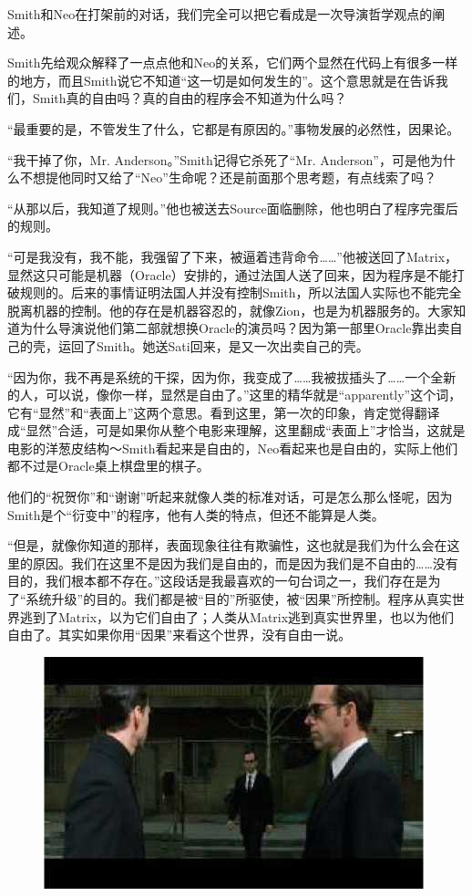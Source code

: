 \documentclass{ctexart}
\begin{document}
Smith和Neo在打架前的对话，我们完全可以把它看成是一次导演哲学观点的阐述。

Smith先给观众解释了一点点他和Neo的关系，它们两个显然在代码上有很多一样的地方，而且Smith说它不知道“这一切是如何发生的”。这个意思就是在告诉我们，Smith真的自由吗？真的自由的程序会不知道为什么吗？

“最重要的是，不管发生了什么，它都是有原因的。”事物发展的必然性，因果论。

“我干掉了你，Mr. Anderson。”Smith记得它杀死了“Mr. Anderson”，可是他为什么不想提他同时又给了“Neo”生命呢？还是前面那个思考题，有点线索了吗？

“从那以后，我知道了规则。”他也被送去Source面临删除，他也明白了程序完蛋后的规则。

“可是我没有，我不能，我强留了下来，被逼着违背命令……”他被送回了Matrix，显然这只可能是机器（Oracle）安排的，通过法国人送了回来，因为程序是不能打破规则的。后来的事情证明法国人并没有控制Smith，所以法国人实际也不能完全脱离机器的控制。他的存在是机器容忍的，就像Zion，也是为机器服务的。大家知道为什么导演说他们第二部就想换Oracle的演员吗？因为第一部里Oracle靠出卖自己的壳，运回了Smith。她送Sati回来，是又一次出卖自己的壳。

“因为你，我不再是系统的干探，因为你，我变成了……我被拔插头了……一个全新的人，可以说，像你一样，显然是自由了。”这里的精华就是“apparently”这个词，它有“显然”和“表面上”这两个意思。看到这里，第一次的印象，肯定觉得翻译成“显然”合适，可是如果你从整个电影来理解，这里翻成“表面上”才恰当，这就是电影的洋葱皮结构～Smith看起来是自由的，Neo看起来也是自由的，实际上他们都不过是Oracle桌上棋盘里的棋子。

他们的“祝贺你”和“谢谢”听起来就像人类的标准对话，可是怎么那么怪呢，因为Smith是个“衍变中”的程序，他有人类的特点，但还不能算是人类。

“但是，就像你知道的那样，表面现象往往有欺骗性，这也就是我们为什么会在这里的原因。我们在这里不是因为我们是自由的，而是因为我们是不自由的……没有目的，我们根本都不存在。”这段话是我最喜欢的一句台词之一，我们存在是为了“系统升级”的目的。我们都是被“目的”所驱使，被“因果”所控制。程序从真实世界逃到了Matrix，以为它们自由了；人类从Matrix逃到真实世界里，也以为他们自由了。其实如果你用“因果”来看这个世界，没有自由一说。

\begin{figure}[htb]
\centering
\includegraphics[width=0.5\linewidth]{fig/read_reloaded-72}
\end{figure}
\end{document}

